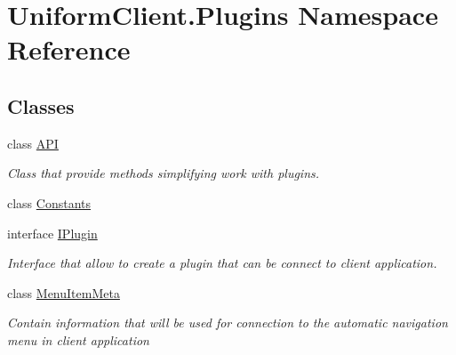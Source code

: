 \hypertarget{namespace_uniform_client_1_1_plugins}{}\section{Uniform\+Client.\+Plugins Namespace Reference}
\label{namespace_uniform_client_1_1_plugins}
\subsection*{Classes}
\begin{DoxyCompactItemize}
\item 
class \mbox{\hyperlink{class_uniform_client_1_1_plugins_1_1_a_p_i}{A\+PI}}
\begin{DoxyCompactList}\small\item\em Class that provide methods simplifying work with plugins. \end{DoxyCompactList}\item 
class \mbox{\hyperlink{class_uniform_client_1_1_plugins_1_1_constants}{Constants}}
\item 
interface \mbox{\hyperlink{interface_uniform_client_1_1_plugins_1_1_i_plugin}{I\+Plugin}}
\begin{DoxyCompactList}\small\item\em Interface that allow to create a plugin that can be connect to client application. \end{DoxyCompactList}\item 
class \mbox{\hyperlink{class_uniform_client_1_1_plugins_1_1_menu_item_meta}{Menu\+Item\+Meta}}
\begin{DoxyCompactList}\small\item\em Contain information that will be used for connection to the automatic navigation menu in client application \end{DoxyCompactList}\end{DoxyCompactItemize}
